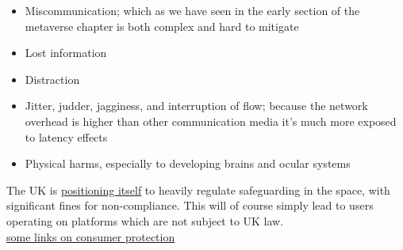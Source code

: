 \begin{itemize}
\item Miscommunication; which as we have seen in the early section of the metaverse chapter is both complex and hard to mitigate
\item Lost information
\item Distraction
\item Jitter, judder, jagginess, and interruption of flow; because the network overhead is higher than other communication media it's much more exposed to latency effects 
\item Physical harms, especially to developing brains and ocular systems
\end{itemize}
The UK is \href{https://bills.parliament.uk/bills/3137}{positioning itself} to heavily regulate safeguarding in the space, with significant fines for non-compliance. This will of course simply lead to users operating on platforms which are not subject to UK law. \\

\href{https://dataethics.eu/the-three-ms-of-the-metaverse/}{some links on consumer protection}
%
